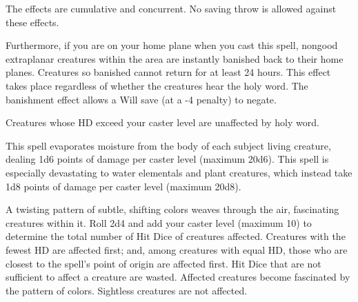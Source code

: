 \begin{multicols}{2}
\begin{small}
\smallskip\noindent The effects are cumulative and concurrent. No saving throw is allowed against these effects.


\smallskip\noindent Furthermore, if you are on your home plane when you cast this spell, nongood extraplanar creatures within the area are instantly banished back to their home planes. Creatures so banished cannot return for at least 24 hours. This effect takes place regardless of whether the creatures hear the holy word. The banishment effect allows a Will save (at a -4 penalty) to negate.

\smallskip\noindent Creatures whose HD exceed your caster level are unaffected by holy word.

\noindent This spell evaporates moisture from the body of each subject living creature, dealing 1d6 points of damage per caster level (maximum 20d6). This spell is especially devastating to water elementals and plant creatures, which instead take 1d8 points of damage per caster level (maximum 20d8).


\noindent A twisting pattern of subtle, shifting colors weaves through the air, fascinating creatures within it. Roll 2d4 and add your caster level (maximum 10) to determine the total number of Hit Dice of creatures affected. Creatures with the fewest HD are affected first; and, among creatures with equal HD, those who are closest to the spell's point of origin are affected first. Hit Dice that are not sufficient to affect a creature are wasted. Affected creatures become fascinated by the pattern of colors. Sightless creatures are not affected.


\end{small}
\end{multicols}
